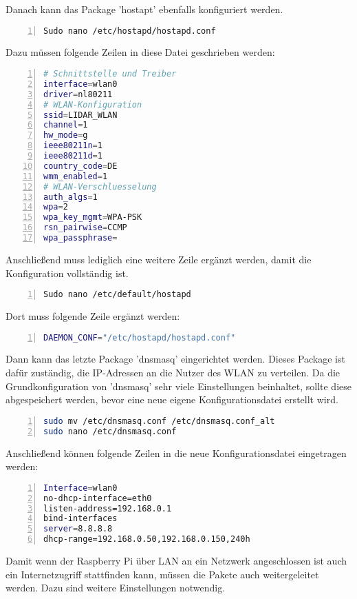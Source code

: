 Danach kann das Package 'hostapt' ebenfalls konfiguriert werden. 
\begin{lstlisting}[caption={Konfiguration Hostapd Schritt 1}, language={bash}, numbers=left]
Sudo nano /etc/hostapd/hostapd.conf
\end{lstlisting}
Dazu müssen folgende Zeilen in diese Datei geschrieben werden:
\begin{lstlisting}[caption={Konfiguration Hostapd Schritt 2}, language={bash}, numbers=left]
# Schnittstelle und Treiber
interface=wlan0
driver=nl80211
# WLAN-Konfiguration
ssid=LIDAR_WLAN
channel=1
hw_mode=g
ieee80211n=1
ieee80211d=1
country_code=DE
wmm_enabled=1
# WLAN-Verschluesselung
auth_algs=1
wpa=2
wpa_key_mgmt=WPA-PSK
rsn_pairwise=CCMP
wpa_passphrase=
\end{lstlisting}
Anschließend muss lediglich eine weitere Zeile ergänzt werden, damit die Konfiguration vollständig ist.
\begin{lstlisting}[caption={Konfiguration Hostapd Schritt 3}, language={bash}, numbers=left]
Sudo nano /etc/default/hostapd
\end{lstlisting}
Dort muss folgende Zeile ergänzt werden:
\begin{lstlisting}[caption={Konfiguration Hostapd Schritt 4}, language={bash}, numbers=left]
DAEMON_CONF="/etc/hostapd/hostapd.conf"
\end{lstlisting}
Dann kann das letzte Package 'dnsmasq' eingerichtet werden. Dieses Package ist dafür zuständig, die \ac{IP}-Adressen an die Nutzer des \ac{WLAN} zu verteilen.
Da die Grundkonfiguration von 'dnsmasq' sehr viele Einstellungen beinhaltet, sollte diese abgespeichert werden, bevor eine neue eigene Konfigurationsdatei erstellt wird.
\begin{lstlisting}[caption={Konfiguration dnsmasq Schritt 1}, language={bash}, numbers=left]
sudo mv /etc/dnsmasq.conf /etc/dnsmasq.conf_alt
sudo nano /etc/dnsmasq.conf
\end{lstlisting}
Anschließend können folgende Zeilen in die neue Konfigurationsdatei eingetragen werden:
\begin{lstlisting}[caption={Konfiguration dnsmasq Schritt 2}, language={bash}, numbers=left]
Interface=wlan0
no-dhcp-interface=eth0
listen-address=192.168.0.1
bind-interfaces
server=8.8.8.8
dhcp-range=192.168.0.50,192.168.0.150,240h
\end{lstlisting}
Damit wenn der Raspberry Pi über \ac{LAN} an ein Netzwerk angeschlossen ist auch ein Internetzugriff stattfinden kann, müssen die Pakete auch weitergeleitet werden. Dazu sind weitere Einstellungen notwendig.
